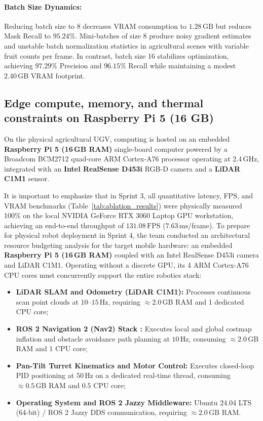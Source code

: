 \documentclass[12pt,a4paper]{article}
\begin{document}
\paragraph{Batch Size Dynamics:}
Reducing batch size to 8 decreases VRAM consumption to $1.28\,\text{GB}$ but reduces Mask Recall to $95.24\%$. Mini-batches of size 8 produce noisy gradient estimates and unstable batch normalization statistics in agricultural scenes with variable fruit counts per frame. In contrast, batch size 16 stabilizes optimization, achieving $97.29\%$ Precision and $96.15\%$ Recall while maintaining a modest $2.40\,\text{GB}$ VRAM footprint.

\subsection{Edge compute, memory, and thermal constraints on Raspberry Pi 5 (16 GB)}
On the physical agricultural UGV, computing is hosted on an embedded \textbf{Raspberry Pi 5 (16\,GB RAM)} single-board computer powered by a Broadcom BCM2712 quad-core ARM Cortex-A76 processor operating at 2.4\,GHz, integrated with an \textbf{Intel RealSense D453i} RGB-D camera and a \textbf{LiDAR C1M1} sensor.

It is important to emphasize that in Sprint 3, all quantitative latency, FPS, and VRAM benchmarks (Table~\ref{tab:ablation_results}) were physically measured 100\% on the local NVIDIA GeForce RTX 3060 Laptop GPU workstation, achieving an end-to-end throughput of $131.08\,\text{FPS}$ ($7.63\,\text{ms}$/frame). To prepare for physical robot deployment in Sprint 4, the team conducted an architectural resource budgeting analysis for the target mobile hardware: an embedded \textbf{Raspberry Pi 5 (16\,GB RAM)} coupled with an Intel RealSense D453i camera and LiDAR C1M1. Operating without a discrete GPU, its 4 ARM Cortex-A76 CPU cores must concurrently support the entire robotics stack:
\begin{itemize}
    \item \textbf{LiDAR SLAM and Odometry (LiDAR C1M1):} Processes continuous scan point clouds at $10\text{--}15\,\text{Hz}$, requiring $\approx 2.0\,\text{GB}$ RAM and 1 dedicated CPU core;
    \item \textbf{ROS 2 Navigation 2 (Nav2) Stack \cite{macenski2020marathon}:} Executes local and global costmap inflation and obstacle avoidance path planning at $10\,\text{Hz}$, consuming $\approx 2.0\,\text{GB}$ RAM and 1 CPU core;
    \item \textbf{Pan-Tilt Turret Kinematics and Motor Control:} Executes closed-loop PID positioning at $50\,\text{Hz}$ on a dedicated real-time thread, consuming $\approx 0.5\,\text{GB}$ RAM and $0.5$ CPU core;
    \item \textbf{Operating System and ROS 2 Jazzy Middleware:} Ubuntu 24.04 LTS (64-bit) / ROS 2 Jazzy DDS communication, requiring $\approx 2.0\,\text{GB}$ RAM.
\end{itemize}
\end{document}
